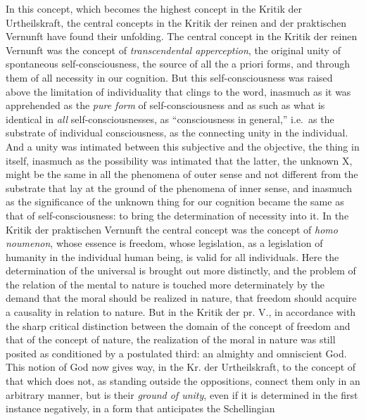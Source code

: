 In this concept, which becomes the highest concept in the Kritik der
Urtheilskraft, the central concepts in the Kritik der reinen and der
praktischen Vernunft have found their unfolding. The central concept in
the Kritik der reinen Vernunft was the concept of \emph{transcendental
apperception}, the original unity of spontaneous self-consciousness,
the source of all the a priori forms, and through them of all necessity
in our cognition. But this self-consciousness was raised above the
limitation of individuality that clings to the word,
inasmuch as it was apprehended as the \emph{pure form} of
self-consciousness and as such as what is identical in \emph{all}
self-consciousnesses, as ``consciousness in general,'' i.e.\ as the
substrate of individual consciousness, as the connecting unity in the
individual. And a unity was intimated between this subjective and the
objective, the thing in itself, inasmuch as the possibility was
intimated that the latter, the unknown X, might be the same in all the
phenomena of outer sense
and not different from the substrate that lay at the ground of the
phenomena of inner sense, and inasmuch as the significance of the
unknown thing for our cognition became the same as that of
self-consciousness: to bring the determination of necessity into it.
In the Kritik der praktischen Vernunft
the central concept was the concept of \emph{homo noumenon}, whose
essence is freedom, whose legislation, as a legislation of humanity in
the individual human being, is valid for all individuals. Here the
determination of the universal is brought out more distinctly, and the
problem of the relation of the mental to nature
is touched more determinately by the demand that the moral should be
realized in nature, that freedom should acquire a causality in relation
to nature. But in the Kritik der pr. V., in accordance with the sharp
critical distinction between the domain of the concept of freedom and
that of the concept of nature, the realization of the moral in nature
was still posited as conditioned by a postulated third: an almighty and
omniscient God. This notion of God now gives way, in the Kr. der
Urtheilskraft, to the concept of that which does not, as standing
outside the oppositions, connect them only in an arbitrary manner, but
is their \emph{ground of unity}, even if it is determined in the first
instance negatively, in a form that anticipates the Schellingian
